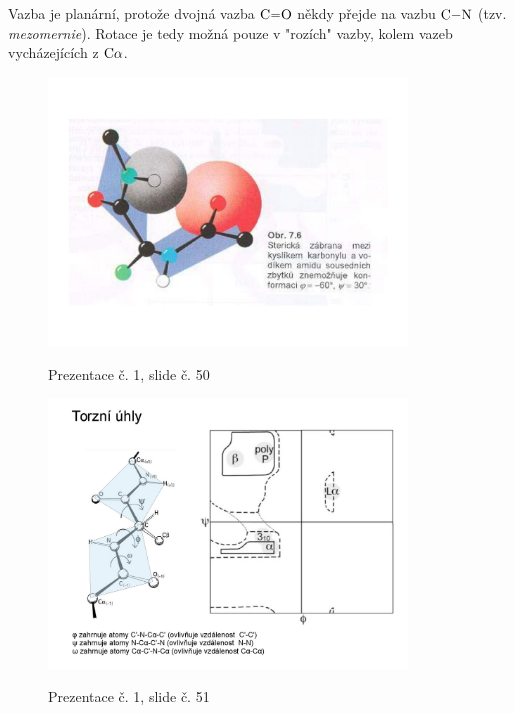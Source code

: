 \documentclass[DIV=8]{scrreprt}
\begin{document}
Vazba je planární, protože dvojná vazba \(\ce{C=O}\) někdy přejde na vazbu \(\ce{C-N}\) (tzv. \emph{mezomernie}). Rotace je tedy možná pouze v "rozích" vazby, kolem vazeb vycházejících z \(\ce{C\alpha}\).

\begin{figure}
    \caption{Prezentace č. 1, slide č. 50}
    \includegraphics[width=0.85\textwidth]{slides-1/slide-50.jpg}
    \centering
    \label{slides-1-slide-50}
\end{figure}
\begin{figure}
    \caption{Prezentace č. 1, slide č. 51}
    \includegraphics[width=0.85\textwidth]{slides-1/slide-51.jpg}
    \centering
    \label{slides-1-slide-51}
\end{figure}
\end{document}
